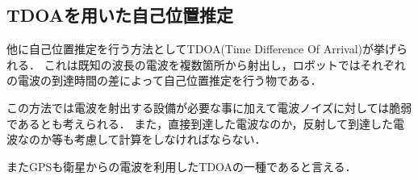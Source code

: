 \subsection{TDOAを用いた自己位置推定}
\label{tdoa_problem}
他に自己位置推定を行う方法としてTDOA(Time Difference Of Arrival)が挙げられる．
これは既知の波長の電波を複数箇所から射出し，ロボットではそれぞれの電波の到達時間の差によって自己位置推定を行う物である．

この方法では電波を射出する設備が必要な事に加えて電波ノイズに対しては脆弱であるとも考えられる．
また，直接到達した電波なのか，反射して到達した電波なのか等も考慮して計算をしなければならない．

またGPSも衛星からの電波を利用したTDOAの一種であると言える．